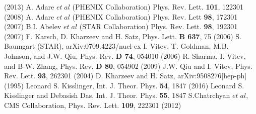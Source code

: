 \begin{thebibliography}{99}
 (2013)
 A. Adare $et\;al$ (PHENIX Collaboration) Phys. Rev. Lett.
{\bf 101}, 122301 (2008) 
 A. Adare $et\;al$ (PHENIX Collaboration) Phys. Rev. Lett
{\bf 98}, 172301 (2007)
 B.I. Abelev $et\;al$ (STAR Collaboration) Phys. Rev. Lett. 
{\bf 98}, 192301 (2007)
 F. Karsch, D. Kharzeev and H. Satz, Phys. Lett. {\bf B 637},
75 (2006) 
 S. Baumgart (STAR), arXiv:0709.4223/nucl-ex
I. Vitev, T. Goldman, M.B. Johnson, and J.W. Qiu, Phys. 
Rev. {\bf D 74}, 054010 (2006)
R. Sharma, I. Vitev, and B-W. Zhang, Phys. Rev. {\bf D 80},
054902 (2009)
  J.W. Qiu and I. Vitev, Phys. Rev. Lett. {\bf 93}, 262301 
(2004)
 D. Kharzeev and H. Satz, arXiv:9508276[hep-ph] (1995)
 Leonard S. Kisslinger, Int. J. Theor. Phys. {\bf 54}, 1847
(2016)
 Leonard S. Kisslinger and Debasish Das, Int. J. Theor. Phys. 
{\bf 55}, 1847
 S.Chatrchyan  $et\;al$, CMS Collaboration, Phys. Rev. Lett. 
{\bf 109}, 222301 (2012)

\end{thebibliography}



